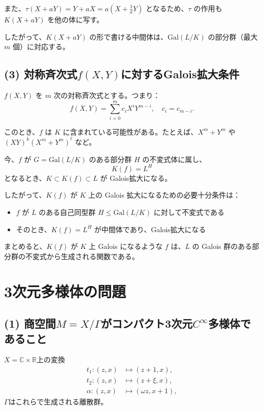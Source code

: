 \documentclass[11pt]{article}
\begin{document}
また、$\tau(X + aY) = Y + aX = a(X + \frac{1}{a}Y)$ となるため、$\tau$ の作用も $K(X + aY)$ を他の体に写す。

\medskip

したがって、$K(X + aY)$ の形で書ける中間体は、$\mathrm{Gal}(L/K)$ の部分群（最大 \( m \) 個）に対応する。

\subsection*{(3) 対称斉次式$f(X,Y)$に対するGalois拡大条件}

$f(X,Y)$ を $m$ 次の対称斉次式とする。つまり：
\[
f(X,Y) = \sum_{i=0}^{m} c_i X^i Y^{m-i},\quad c_i = c_{m-i}.
\]

このとき、$f$ は $K$ に含まれている可能性がある。たとえば、$X^m + Y^m$ や $(XY)^k(X^m + Y^m)^\ell$ など。

\medskip

今、$f$ が $G = \mathrm{Gal}(L/K)$ のある部分群 $H$ の不変式体に属し、
\[
K(f) = L^H
\]
となるとき、$K \subset K(f) \subset L$ が Galois拡大になる。

したがって、$K(f)$ が $K$ 上の Galois 拡大になるための必要十分条件は：

\begin{itemize}
    \item $f$ が $L$ のある自己同型群 $H \leq \mathrm{Gal}(L/K)$ に対して不変式である
    \item そのとき、$K(f) = L^H$ が中間体であり、Galois拡大になる
\end{itemize}

\medskip

まとめると、$K(f)$ が $K$ 上 Galois になるような $f$ は、$L$ の Galois 群のある部分群の不変式から生成される関数である。


\bigskip


\section*{3次元多様体の問題}

\subsection*{(1) 商空間$M=X/\Gamma$がコンパクト3次元$C^\infty$多様体であること}

$X=\mathbb{C}\times \mathbb{R}$上の変換
\[
\begin{aligned}
t_1:(z,x)&\mapsto(z+1,x),\\
t_2:(z,x)&\mapsto(z+\xi,x),\\
\alpha:(z,x)&\mapsto(\omega z,x+1),
\end{aligned}
\]
$\Gamma$はこれらで生成される離散群。
\end{document}
